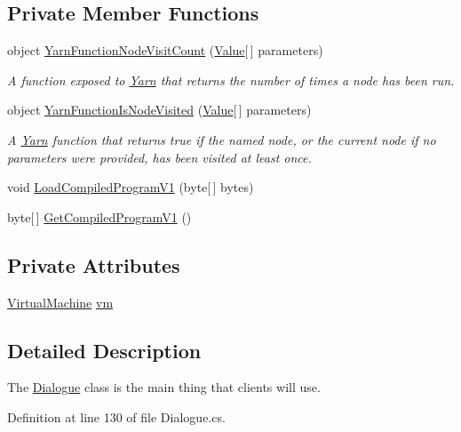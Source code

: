 \subsection*{Private Member Functions}
\begin{DoxyCompactItemize}
\item 
object \hyperlink{a00094_a10c9f22d3f55e74f091cd6069c431094}{Yarn\-Function\-Node\-Visit\-Count} (\hyperlink{a00189}{Value}\mbox{[}$\,$\mbox{]} parameters)
\begin{DoxyCompactList}\small\item\em A function exposed to \hyperlink{a00053}{Yarn} that returns the number of times a node has been run. \end{DoxyCompactList}\item 
object \hyperlink{a00094_a1ab129bd84381928531d503304ca08d6}{Yarn\-Function\-Is\-Node\-Visited} (\hyperlink{a00189}{Value}\mbox{[}$\,$\mbox{]} parameters)
\begin{DoxyCompactList}\small\item\em A \hyperlink{a00053}{Yarn} function that returns true if the named node, or the current node if no parameters were provided, has been visited at least once. \end{DoxyCompactList}\item 
void \hyperlink{a00094_a706df08e842c2419f7a66fd40c0a544f}{Load\-Compiled\-Program\-V1} (byte\mbox{[}$\,$\mbox{]} bytes)
\item 
byte\mbox{[}$\,$\mbox{]} \hyperlink{a00094_a070898dbc07fd7d0a74d7c3ac1848beb}{Get\-Compiled\-Program\-V1} ()
\end{DoxyCompactItemize}
\subsection*{Private Attributes}
\begin{DoxyCompactItemize}
\item 
\hyperlink{a00164}{Virtual\-Machine} \hyperlink{a00094_a8c1319357a9df6cff051328fb33224c7}{vm}
\end{DoxyCompactItemize}


\subsection{Detailed Description}
The \hyperlink{a00094}{Dialogue} class is the main thing that clients will use. 

Definition at line 130 of file Dialogue.\-cs.



